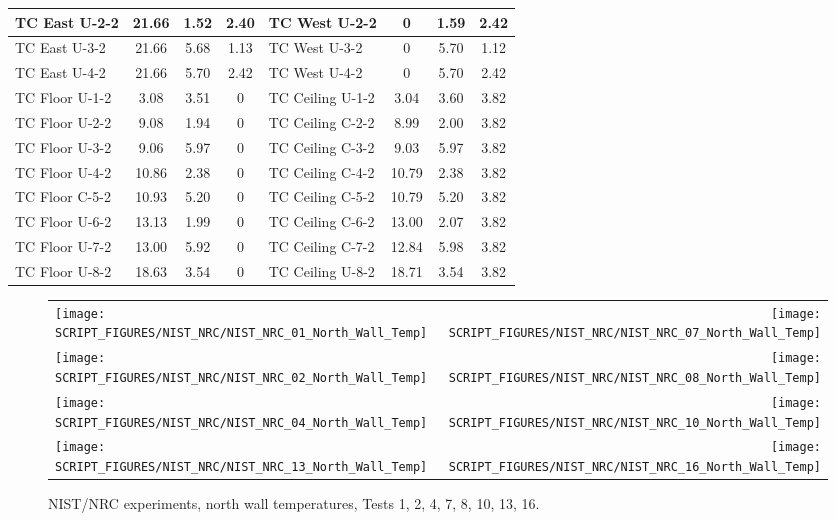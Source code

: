 \begin{table}[ht]
\begin{center}
\begin{tabular}{|l|c|c|c||l|c|c|c|}
TC East U-2-2     & 21.66 & 1.52 & 2.40     & TC West U-2-2     & 0     & 1.59  & 2.42      \\ \hline
TC East U-3-2     & 21.66 & 5.68 & 1.13     & TC West U-3-2     & 0     & 5.70  & 1.12      \\ \hline
TC East U-4-2     & 21.66 & 5.70 & 2.42     & TC West U-4-2     & 0     & 5.70  & 2.42      \\ \hline \hline
TC Floor U-1-2    & 3.08  & 3.51 & 0        & TC Ceiling U-1-2  & 3.04  & 3.60  & 3.82      \\ \hline
TC Floor U-2-2    & 9.08  & 1.94 & 0        & TC Ceiling C-2-2  & 8.99  & 2.00  & 3.82      \\ \hline
TC Floor U-3-2    & 9.06  & 5.97 & 0        & TC Ceiling C-3-2  & 9.03  & 5.97  & 3.82      \\ \hline
TC Floor U-4-2    & 10.86 & 2.38 & 0        & TC Ceiling C-4-2  & 10.79 & 2.38  & 3.82      \\ \hline
TC Floor C-5-2    & 10.93 & 5.20 & 0        & TC Ceiling C-5-2  & 10.79 & 5.20  & 3.82      \\ \hline
TC Floor U-6-2    & 13.13 & 1.99 & 0        & TC Ceiling C-6-2  & 13.00 & 2.07  & 3.82      \\ \hline
TC Floor U-7-2    & 13.00 & 5.92 & 0        & TC Ceiling C-7-2  & 12.84 & 5.98  & 3.82      \\ \hline
TC Floor U-8-2    & 18.63 & 3.54 & 0        & TC Ceiling U-8-2  & 18.71 & 3.54  & 3.82      \\ \hline
\end{tabular}
\end{center}
\label{NIST_NRC_Wall_Coords}
\end{table}

\newpage

\begin{figure}[p]
\begin{tabular*}{\textwidth}{l@{\extracolsep{\fill}}r}
\texttt{[image: SCRIPT\_FIGURES/NIST\_NRC/NIST\_NRC\_01\_North\_Wall\_Temp]} &
\texttt{[image: SCRIPT\_FIGURES/NIST\_NRC/NIST\_NRC\_07\_North\_Wall\_Temp]} \\
\texttt{[image: SCRIPT\_FIGURES/NIST\_NRC/NIST\_NRC\_02\_North\_Wall\_Temp]} &
\texttt{[image: SCRIPT\_FIGURES/NIST\_NRC/NIST\_NRC\_08\_North\_Wall\_Temp]} \\
\texttt{[image: SCRIPT\_FIGURES/NIST\_NRC/NIST\_NRC\_04\_North\_Wall\_Temp]} &
\texttt{[image: SCRIPT\_FIGURES/NIST\_NRC/NIST\_NRC\_10\_North\_Wall\_Temp]} \\
\texttt{[image: SCRIPT\_FIGURES/NIST\_NRC/NIST\_NRC\_13\_North\_Wall\_Temp]} &
\texttt{[image: SCRIPT\_FIGURES/NIST\_NRC/NIST\_NRC\_16\_North\_Wall\_Temp]}
\end{tabular*}
\caption[NIST/NRC experiments, north wall temperatures, Tests 1, 2, 4, 7, 8, 10, 13, 16]{NIST/NRC experiments, north wall temperatures, Tests 1, 2, 4, 7, 8, 10, 13, 16.}
\label{NIST_NRC_North_Wall_Temp_Closed}
\end{figure}


